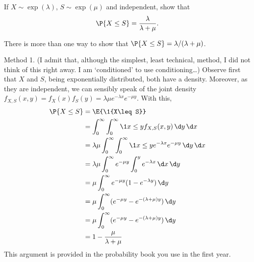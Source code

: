 \begin{question}\label{ex:3}
   If $X\sim \exp(\lambda)$, $S\sim\exp(\mu)$ and independent, show that 
    \begin{equation*}
      \P{X\leq S} = \frac{\lambda}{\lambda+\mu}.
    \end{equation*}

    \begin{hint}
    \end{hint}

\begin{solution}
There is more than one way to show that $\P{X\leq S} = \lambda/(\lambda+\mu)$.  

Method 1. (I admit that, although the simplest, least technical,
method, I did not think of this right away. I am `conditioned' to use
conditioning\ldots) Observe first that $X$ and $S$, being
exponentially distributed, both have a density. Moreover, as they are
independent, we can sensibly speak of the joint density
$f_{X,S}(x,y) = f_X(x)f_S(y) = \lambda \mu e^{-\lambda x} e^{-\mu
  y}$. With this,
\begin{equation*}
  \begin{split}
    \P{X\leq S} 
&= \E{\1{X\leq S}} \\
&= \int_0^\infty \int_0^\infty \1{x\leq y} f_{X,S}(x,y)\, \d y\,\d x\\
&= \lambda \mu \int_0^\infty \int_0^\infty \1{x\leq y} e^{-\lambda x} e^{-\mu y} \, \d y\,\d x\\
&= \lambda \mu \int_0^\infty e^{-\mu y} \int_0^y e^{-\lambda x}\, \d x \, \d y \\
&= \mu \int_0^\infty e^{-\mu y} (1-e^{-\lambda y})\,\d y\\
&= \mu \int_0^\infty (e^{-\mu y} - e^{-(\lambda +\mu)y} ) \,\d y\\
&= \mu \int_0^\infty (e^{-\mu y} - e^{-(\lambda +\mu)y} ) \,\d y\\
&= 1 - \frac{\mu}{\lambda + \mu} 
  \end{split}
\end{equation*}
This argument is provided in the probability book you use in the first year.


\end{solution}
\end{question}
